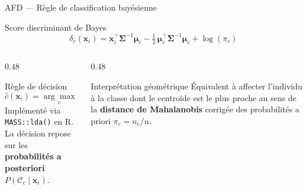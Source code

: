 \documentclass[aspectratio=169, 10pt]{beamer}
\begin{document}
\begin{frame}{AFD — Règle de classification bayésienne}
    \begin{block}{Score discriminant de Bayes}
        \[
            \delta_c(\mathbf{x}_i)
            = \mathbf{x}_i^{\top}\boldsymbol{\Sigma}^{-1}\boldsymbol{\mu}_c
            - \tfrac{1}{2}\,\boldsymbol{\mu}_c^{\top}
              \boldsymbol{\Sigma}^{-1}\boldsymbol{\mu}_c
            + \log(\pi_c)
        \]
    \end{block}
    \vspace{4pt}
    \begin{columns}[T]
        \begin{column}{0.48\textwidth}
            \begin{block}{Règle de décision}
                \[
                    \hat{c}(\mathbf{x}_i)
                    = \underset{c}{\arg\max}\;
                      \delta_c(\mathbf{x}_i)
                \]
                \small Implémenté via \texttt{MASS::lda()} en R.\\
                La décision repose sur les \textbf{probabilités
                a posteriori} $P(\mathcal{C}_c \mid \mathbf{x}_i)$.
            \end{block}
        \end{column}
        \begin{column}{0.48\textwidth}
            \begin{exampleblock}{Interprétation géométrique}
                Équivalent à affecter l'individu à la classe dont
                le centroïde est le plus proche au sens de la
                \textbf{distance de Mahalanobis} corrigée des
                probabilités a priori $\pi_c = n_c / n$.
            \end{exampleblock}
        \end{column}
    \end{columns}
\end{frame}
\end{document}
